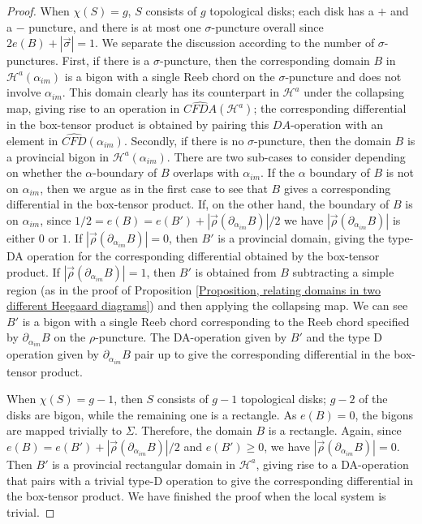 \documentclass{amsart}
\theoremstyle{definition}
\theoremstyle{remark}
\numberwithin{equation}{section}
\numberwithin{equation}{section} \makeatletter
\begin{document}
\begin{proof}
When $\chi(S)=g$, $S$ consists of $g$ topological disks; each disk has a $+$ and a $-$ puncture, and there is at most one $\sigma$-puncture overall since $2e(B)+|\overrightarrow{\sigma}|=1$. We separate the discussion according to the number of $\sigma$-punctures. First, if there is a $\sigma$-puncture, then the corresponding domain $B$ in $\mathcal{H}^a(\alpha_{im})$ is a bigon with a single Reeb chord on the $\sigma$-puncture and does not involve $\alpha_{im}$. This domain clearly has its counterpart in $\mathcal{H}^a$ under the collapsing map, giving rise to an operation in $\widehat{CFDA}(\mathcal{H}^a)$; the corresponding differential in the box-tensor product is obtained by pairing this $DA$-operation with an element in $\widehat{CFD}(\alpha_{im})$. Secondly, if there is no $\sigma$-puncture, then the domain $B$ is a provincial bigon in $\mathcal{H}^a(\alpha_{im})$. There are two sub-cases to consider depending on whether the $\alpha$-boundary of $B$ overlaps with $\alpha_{im}$. If the $\alpha$ boundary of $B$ is not on $\alpha_{im}$, then we argue as in the first case to see that $B$ gives a corresponding differential in the box-tensor product. If, on the other hand, the boundary of $B$ is on $\alpha_{im}$, since $1/2=e(B)=e(B')+|\overrightarrow{\rho}(\partial_{\alpha_{im}}B)|/{2}$ we have $|\overrightarrow{\rho}(\partial_{\alpha_{im}}B)|$ is either $0$ or $1$. If $|\overrightarrow{\rho}(\partial_{\alpha_{im}}B)|=0$, then $B'$ is a provincial domain, giving the type-DA operation for the corresponding differential obtained by the box-tensor product.  If $|\overrightarrow{\rho}(\partial_{\alpha_{im}}B)|=1$, then $B'$ is obtained from $B$ subtracting a simple region (as in the proof of Proposition \ref{Proposition, relating domains in two different Heegaard diagrams}) and then applying the collapsing map. We can see $B'$ is a bigon with a single Reeb chord corresponding to the Reeb chord specified by $\partial_{\alpha_{im}}B$ on the $\rho$-puncture. The DA-operation given by $B'$ and the type D operation given by $\partial_{\alpha_{im}}B$ pair up to give the corresponding differential in the box-tensor product.

When $\chi(S)=g-1$, then $S$ consists of $g-1$ topological disks; $g-2$ of the disks are bigon, while the remaining one is a rectangle. As $e(B)=0$, the bigons are mapped trivially to $\Sigma$. Therefore, the domain $B$ is a rectangle. Again, since $e(B)=e(B')+|\overrightarrow{\rho}(\partial_{\alpha_{im}}B)|/{2}$ and $e(B')\geq 0$, we have $|\overrightarrow{\rho}(\partial_{\alpha_{im}}B)|=0$. Then $B'$ is a provincial rectangular domain in $\mathcal{H}^a$, giving rise to a DA-operation that pairs with a trivial type-D operation to give the corresponding differential in the box-tensor product. We have finished the proof when the local system is trivial.


\end{proof}
\end{document}

